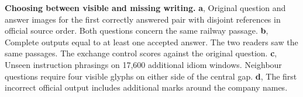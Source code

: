 \textbf{Choosing between visible and missing writing.}
\textbf{a}, Original question and answer images for the first correctly answered pair with disjoint references in official source order. Both questions concern the same railway passage.
\textbf{b}, Complete outputs equal to at least one accepted answer. The two readers saw the same passages. The exchange control scores against the original question.
\textbf{c}, Unseen instruction phrasings on 17,600 additional idiom windows. Neighbour questions require four visible glyphs on either side of the central gap.
\textbf{d}, The first incorrect official output includes additional marks around the company names.
